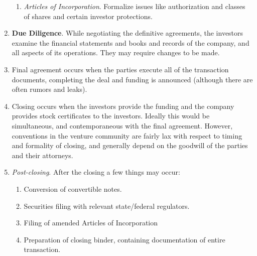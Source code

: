 \documentclass{article}
\begin{document}
\begin{enumerate}
\begin{enumerate}
          \item \textit{Articles of Incorporation}. Formalize issues like authorization and classes of shares and certain investor protections. 
      \end{enumerate}
      \item \textbf{Due Diligence}. While negotiating the definitive agreements, the investors examine the financial statements and books and records of the company, and all aspects of its operations. They may require changes to be made. 
      \item Final agreement occurs when the parties execute all of the transaction documents, completing the deal and funding is announced (although there are often rumors and leaks). 
      \item Closing occurs when the investors provide the funding and the company provides stock certificates to the investors. Ideally this would be simultaneous, and contemporaneous with the final agreement. However, conventions in the venture community are fairly lax with respect to timing and formality of closing, and generally depend on the goodwill of the parties and their attorneys. 
      \item \textit{Post-closing}. After the closing a few things may occur: 
      \begin{enumerate}
          \item Conversion of convertible notes. 
          \item Securities filing with relevant state/federal regulators. 
          \item Filing of amended Articles of Incorporation
          \item Preparation of closing binder, containing documentation of entire transaction. 
      \end{enumerate}
    \end{enumerate}
\end{document}
